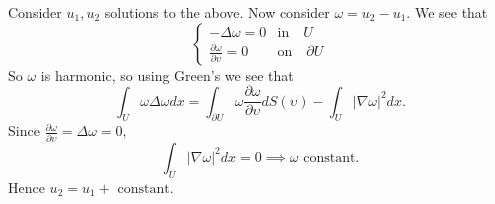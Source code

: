 \documentclass{article}
\begin{document}
    Consider $u_1,u_2$ solutions to the above. Now consider $\omega = u_2 - u_1$. We see that
    \[\begin{cases}
      -\Delta \omega = 0 &\text{in}\quad U \\
      \frac{\partial \omega}{\partial \upsilon} = 0 &\text{on}\quad \partial U
    \end{cases}\]
    So $\omega$ is harmonic, so using Green's we see that
    \[\int_U \omega\Delta\omega dx = \int_{\partial U}\omega\frac{\partial \omega}{\partial \upsilon} dS(\upsilon) - \int_U |\nabla \omega|^2dx.\]
    Since $\frac{\partial \omega}{\partial \upsilon} = \Delta \omega = 0$, 
    \[\int_U |\nabla \omega|^2dx = 0 \implies \omega \text{ constant.}\]
    Hence $u_2 = u_1 + \text{ constant}$.
    
\end{document}
